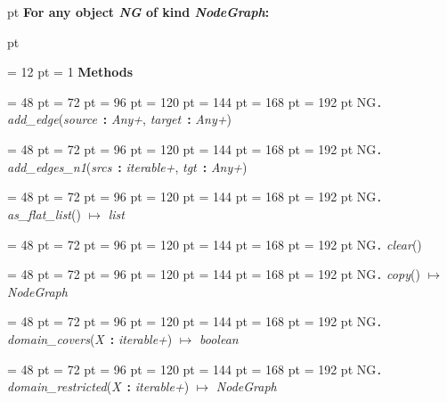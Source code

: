 {{{{{\par \pagebreak[2]  pt \noindent
{\large {\bf For any object {\em NG\/} of kind  {\em NodeGraph\/}:\/}}\par {} pt
} \noindent
\par}
{\par \pagebreak[3.200000] \noindent \hangindent = 12 pt \hangafter = 1 
{\bf {\large {\bf Methods\/}}\/}\par}
{\par \noindent  \leftskip = 48 pt  \leftmargini = 72 pt  \leftmarginii = 96 pt  \leftmarginiii = 120 pt  \leftmarginiv = 144 pt  \leftmarginv = 168 pt  \leftmarginvi = 192 pt NG{\large {\tt .\/} {\em add{\_}edge\/}}({\em source\/}~{\bf :}  {\em Any+\/}, {\em target\/}~{\bf :}  {\em Any+\/})\par}
{\par \noindent  \leftskip = 48 pt  \leftmargini = 72 pt  \leftmarginii = 96 pt  \leftmarginiii = 120 pt  \leftmarginiv = 144 pt  \leftmarginv = 168 pt  \leftmarginvi = 192 pt NG{\large {\tt .\/} {\em add{\_}edges{\_}n1\/}}({\em srcs\/}~{\bf :}  {\em iterable+\/}, {\em tgt\/}~{\bf :}  {\em Any+\/})\par}
{\par \noindent  \leftskip = 48 pt  \leftmargini = 72 pt  \leftmarginii = 96 pt  \leftmarginiii = 120 pt  \leftmarginiv = 144 pt  \leftmarginv = 168 pt  \leftmarginvi = 192 pt NG{\large {\tt .\/} {\em as{\_}flat{\_}list\/}}() \(\mapsto \)  {\em list\/}\par}
{\par \noindent  \leftskip = 48 pt  \leftmargini = 72 pt  \leftmarginii = 96 pt  \leftmarginiii = 120 pt  \leftmarginiv = 144 pt  \leftmarginv = 168 pt  \leftmarginvi = 192 pt NG{\large {\tt .\/} {\em clear\/}}()\par}
{\par \noindent  \leftskip = 48 pt  \leftmargini = 72 pt  \leftmarginii = 96 pt  \leftmarginiii = 120 pt  \leftmarginiv = 144 pt  \leftmarginv = 168 pt  \leftmarginvi = 192 pt NG{\large {\tt .\/} {\em copy\/}}() \(\mapsto \)  {\em NodeGraph\/}\par}
{\par \noindent  \leftskip = 48 pt  \leftmargini = 72 pt  \leftmarginii = 96 pt  \leftmarginiii = 120 pt  \leftmarginiv = 144 pt  \leftmarginv = 168 pt  \leftmarginvi = 192 pt NG{\large {\tt .\/} {\em domain{\_}covers\/}}({\em X\/}~{\bf :}  {\em iterable+\/}) \(\mapsto \)  {\em boolean\/}\par}
{\par \noindent  \leftskip = 48 pt  \leftmargini = 72 pt  \leftmarginii = 96 pt  \leftmarginiii = 120 pt  \leftmarginiv = 144 pt  \leftmarginv = 168 pt  \leftmarginvi = 192 pt NG{\large {\tt .\/} {\em domain{\_}restricted\/}}({\em X\/}~{\bf :}  {\em iterable+\/}) \(\mapsto \)  {\em NodeGraph\/}\par}
}}}
